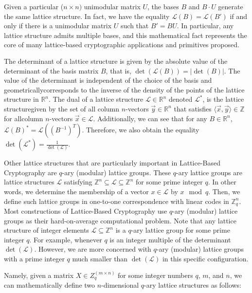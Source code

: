 \documentclass[runningheads]{llncs}
\numberwithin{equation}{section}
\begin{document}
    \noindent Given a particular ($n \times n)$ unimodular matrix $U$, the bases $B$ and $B \cdot U$ generate the same lattice structure. In fact, we have the equality $\mathcal{L}(B) = \mathcal{L}(B')$ if and only if there is a unimodular matrix $U$ such that $B' = BU$. In particular, any lattice structure admits multiple bases, and this mathematical fact represents the core of many lattice-based cryptographic applications and primitives proposed. 

    The determinant of a lattice structure is given by the absolute value of the determinant of the basis matrix $B$, that is, $\det(\mathcal{L}(B)) = |\det(B)|$. The value of the determinant is independent of the choice of the basis and geometrically\break corresponds to the inverse of the density of the points of the lattice structure in ${\mathbb{R}}^{n}$. The dual of a lattice structure $\mathcal{L} \in {\mathbb{R}}^{n}$ denoted ${\mathcal{L}}^{*}$, is the lattice structure\break given by the set of all column $n$-vectors $\Vec{y} \in {\mathbb{R}}^{n}$ that satisfies $\langle \Vec{x}, \Vec{y} \rangle \in \mathbb{Z}$ for all\break column $n$-vectors $\Vec{x} \in \mathcal{L}$. Additionally, we can see that for any $B \in {\mathbb{R}}^{n}$,\break ${\mathcal{L}(B)}^{*} = \mathcal{L}({({B}^{-1})}^{T})$. Therefore, we also obtain the equality $\det({\mathcal{L}}^{*}) = \frac{1}{\det(\mathcal{L})}$. 
    
    Other lattice structures that are particularly important in Lattice-Based Cryptography are $q$-ary (modular) lattice groups. These $q$-ary lattice groups are lattice structures $\mathcal{L}$ satisfying ${\mathbb{Z}}^{n} \subseteq \mathcal{L} \subseteq {\mathbb{Z}}^{n}$ for some prime integer $q$. In other words, we determine the membership of a vector $x \in \mathcal{L}$ by $x \mod q$. Then, we define such lattice groups in one-to-one correspondence with linear codes in ${\mathbb{Z}}^{n}_{q}$. Most constructions of Lattice-Based Cryptography use $q$-ary (modular) lattice groups as their hard-on-average computational problem. Note that any lattice structure of integer elements $\mathcal{L} \subseteq {\mathbb{Z}}^{n}$ is a $q$-ary lattice group for some prime integer $q$. For example, whenever $q$ is an integer multiple of the determinant $\det(\mathcal{L})$. However, we are more concerned with $q$-ary (modular) lattice groups with a prime integer $q$ much smaller than $\det(\mathcal{L})$ in this specific configuration.

    \noindent Namely, given a matrix $X \in {Z}^{(m \times n)}_{q}$ for some integer numbers $q$, $m$, and $n$, we can mathematically define two $n$-dimensional $q$-ary lattice structures as follows:
    
\end{document}
